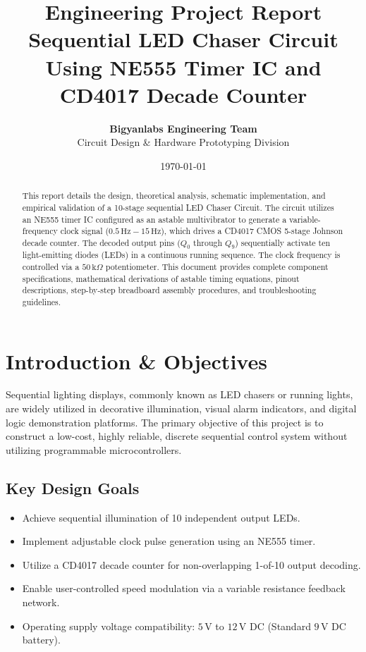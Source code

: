 \documentclass[11pt,a4paper]{article}
\title{\textbf{\Huge Engineering Project Report}\\[0.5em] \Large Sequential LED Chaser Circuit Using NE555 Timer IC and CD4017 Decade Counter}
\author{\textbf{Bigyanlabs Engineering Team}\\ Circuit Design \& Hardware Prototyping Division}
\date{\today}
\begin{document}
\maketitle
\thispagestyle{empty}

\begin{abstract}
This report details the design, theoretical analysis, schematic implementation, and empirical validation of a 10-stage sequential LED Chaser Circuit. The circuit utilizes an NE555 timer IC configured as an astable multivibrator to generate a variable-frequency clock signal ($0.5\,\text{Hz} - 15\,\text{Hz}$), which drives a CD4017 CMOS 5-stage Johnson decade counter. The decoded output pins ($Q_0$ through $Q_9$) sequentially activate ten light-emitting diodes (LEDs) in a continuous running sequence. The clock frequency is controlled via a $50\,\text{k}\Omega$ potentiometer. This document provides complete component specifications, mathematical derivations of astable timing equations, pinout descriptions, step-by-step breadboard assembly procedures, and troubleshooting guidelines.
\end{abstract}

\newpage
\tableofcontents
\newpage

\section{Introduction \& Objectives}
Sequential lighting displays, commonly known as LED chasers or running lights, are widely utilized in decorative illumination, visual alarm indicators, and digital logic demonstration platforms. The primary objective of this project is to construct a low-cost, highly reliable, discrete sequential control system without utilizing programmable microcontrollers.

\subsection{Key Design Goals}
\begin{itemize}
    \item Achieve sequential illumination of 10 independent output LEDs.
    \item Implement adjustable clock pulse generation using an NE555 timer.
    \item Utilize a CD4017 decade counter for non-overlapping 1-of-10 output decoding.
    \item Enable user-controlled speed modulation via a variable resistance feedback network.
    \item Operating supply voltage compatibility: $5\,\text{V}$ to $12\,\text{V}$ DC (Standard $9\,\text{V}$ DC battery).
\end{itemize}
\end{document}
